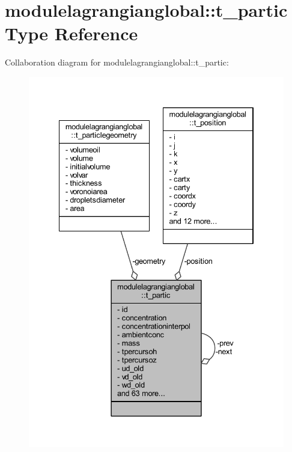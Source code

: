 \hypertarget{structmodulelagrangianglobal_1_1t__partic}{}\section{modulelagrangianglobal\+:\+:t\+\_\+partic Type Reference}
\label{structmodulelagrangianglobal_1_1t__partic}


Collaboration diagram for modulelagrangianglobal\+:\+:t\+\_\+partic\+:\nopagebreak
\begin{figure}[H]
\begin{center}
\leavevmode
\includegraphics[width=334pt]{structmodulelagrangianglobal_1_1t__partic__coll__graph}
\end{center}
\end{figure}
